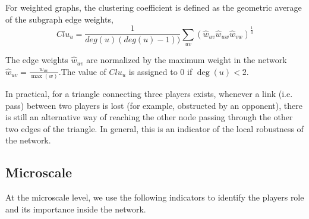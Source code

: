 \documentclass{mcmthesis}
\begin{document}
For weighted graphs, the clustering coefficient is defined as the geometric average of the subgraph edge weights,
\begin{equation}
  Clu_u = \frac{1}{deg(u)(deg(u)-1))} \sum_{uv} (\hat{w}_{uv} \hat{w}_{uw} \hat{w}_{vw})^{\frac{1}{3}}
\end{equation}

The edge weights $\hat{w}_{uv}$ are normalized by the maximum weight in the
network $\hat{w}_{uv} = \frac{w_{uv}}{\max(w)}$.The value of $Clu_u$ is assigned to 0 if $\deg(u)<2$.

In practical, for a triangle connecting three players exists, whenever a link (i.e. pass) between two players is lost (for example, obstructed by an opponent), there is still an alternative way of reaching the other node passing through the other two edges of the triangle. In general, this is an indicator of the local robustness of the network.\cite{2}

\subsection{Microscale}

At the microscale level, we use the following indicators to identify the players role and its importance inside the network.
\end{document}

